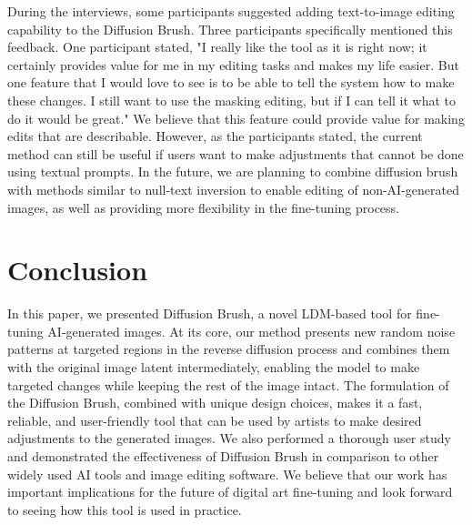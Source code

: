 \documentclass[10pt,twocolumn,letterpaper]{article}
\begin{document}
During the interviews, some participants suggested adding text-to-image editing capability to the Diffusion Brush. Three participants specifically mentioned this feedback. One participant stated, "I really like the tool as it is right now; it certainly provides value for me in my editing tasks and makes my life easier. But one feature that I would love to see is to be able to tell the system how to make these changes. I still want to use the masking editing, but if I can tell it what to do it would be great." We believe that this feature could provide value for making edits that are describable. However, as the participants stated, the current method can still be useful if users want to make adjustments that cannot be done using textual prompts. In the future, we are planning to combine diffusion brush with methods similar to null-text inversion \cite{mokady2023null} to enable editing of non-AI-generated images, as well as providing more flexibility in the fine-tuning process. 

\section{Conclusion}
In this paper, we presented Diffusion Brush, a novel LDM-based tool for fine-tuning AI-generated images. At its core, our method presents new random noise patterns at targeted regions in the reverse diffusion process and combines them with the original image latent intermediately, enabling the model to make targeted changes while keeping the rest of the image intact.  The formulation of the Diffusion Brush, combined with unique design choices, makes it a fast, reliable, and user-friendly tool that can be used by artists to make desired adjustments to the generated images. We also performed a thorough user study and demonstrated the effectiveness of Diffusion Brush in comparison to other widely used AI tools and image editing software. We believe that our work has important implications for the future of digital art fine-tuning and look forward to seeing how this tool is used in practice.



{\small


}

\end{document}
